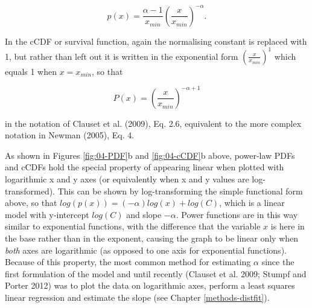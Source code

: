 \documentclass[
  12pt,
]{book}
\begin{document}
\begin{equation}
p(x) = \frac{\alpha-1}{x_{min}}(\frac{x}{x_{min}})^{-\alpha}.
\label{eq:power-law}
\end{equation}

In the cCDF or survival function, again the normalising constant is replaced with 1, but rather than left out it is written in the exponential form \((\frac{x}{x_{min}})^1\) which equals 1 when \(x = x_{min}\), so that

\begin{equation}
P(x) = (\frac{x}{x_{min}})^{-\alpha+1}
\label{eq:pareto}
\end{equation}

in the notation of Clauset et al. (2009), Eq. 2.6, equivalent to the more complex notation in Newman (2005), Eq. 4.

As shown in Figures \ref{fig:04-PDF}b and \ref{fig:04-cCDF}b above, power-law PDFs and cCDFs hold the special property of appearing linear when plotted with logarithmic x and y axes (or equivalently when x and y values are log-transformed). This can be shown by log-transforming the simple functional form above, so that \(log(p(x))=(-\alpha)log(x)+log(C)\), which is a linear model with y-intercept \(log(C)\) and slope \(-\alpha\). Power functions are in this way similar to exponential functions, with the difference that the variable \(x\) is here in the base rather than in the exponent, causing the graph to be linear only when \emph{both} axes are logarithmic (as opposed to one axis for exponential functions). Because of this property, the most common method for estimating \(\alpha\) since the first formulation of the model and until recently (Clauset et al. 2009; Stumpf and Porter 2012) was to plot the data on logarithmic axes, perform a least squares linear regression and estimate the slope (see Chapter \ref{methods-distfit}).
\end{document}

